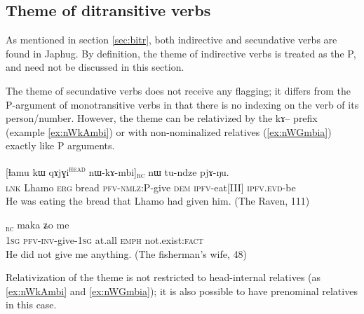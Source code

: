 \documentclass[oldfontcommands,oneside,a4paper,11pt]{article}
\newcommand{\ipa}[1]{{\phon #1}} %
\newcommand{\topic}{\textsc{dem}}
\newcommand{\tete}{\textsuperscript{\textsc{head}}}
\newcommand{\rc}{\textsubscript{\textsc{rc}}}
\begin{document}
\subsection{Theme of ditransitive verbs}  \label{sec:second}
As mentioned in section \ref{sec:bitr}, both indirective and secundative verbs are found in Japhug. By definition, the theme of indirective verbs is treated as the P, and need not be discussed in this section.

The theme of secundative verbs does not receive  any flagging; it differs from the P-argument of monotransitive verbs in that there is no indexing on the verb of its person/number. However, the theme can be relativized by the \ipa{kɤ}-- prefix (example \ref{ex:nWkAmbi}) or with non-nominalized relatives (\ref{ex:nWGmbia}) exactly like P arguments. 

\begin{exe}
\ex \label{ex:nWkAmbi}
\gll      \ipa{tɕe} 	[\ipa{ɬamu} 	\ipa{kɯ} 	\ipa{qɤjɣi}\tete{} 	\ipa{nɯ-kɤ-mbi}]\rc{} 	\ipa{nɯ} 	\ipa{tu-ndze} 	\ipa{pjɤ-ŋu.}   \\
\textsc{lnk} Lhamo \textsc{erg} bread \textsc{pfv-nmlz}:P-give \topic{} \textsc{ipfv}-eat[III] \textsc{ipfv.evd}-be  \\
 \glt    He was eating the bread that Lhamo had given him. (The Raven, 111)
\end{exe} 


       \begin{exe}
   \ex \label{ex:nWGmbia}
   \gll [\ipa{aʑo} 	\ipa{nɯ́-wɣ-mbi-a}]\rc{} 	\ipa{maka} 	\ipa{ʑo} 	\ipa{me} \\
 \textsc{1sg}  \textsc{pfv-inv}-give-\textsc{1sg} at.all \textsc{emph} not.exist:\textsc{fact} \\
\glt  He did not give me anything. (The fisherman's wife, 48)
\end{exe}

Relativization of the theme is not restricted to head-internal relatives  (as  \ref{ex:nWkAmbi} and \ref{ex:nWGmbia}); it is also possible to have prenominal relatives in this case.
\end{document}
